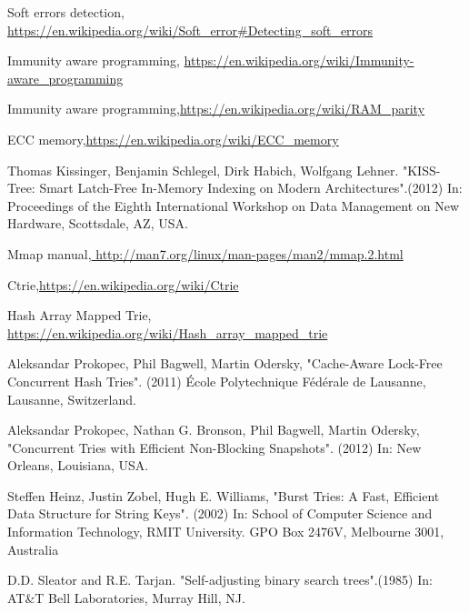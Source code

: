 \documentclass[12pt]{report}
\begin{document}
\begin{thebibliography}{1}
 Soft errors detection, \url{https://en.wikipedia.org/wiki/Soft_error#Detecting_soft_errors}

 Immunity aware programming, \url{https://en.wikipedia.org/wiki/Immunity-aware_programming}


Immunity aware programming,\url{https://en.wikipedia.org/wiki/RAM_parity}

 ECC memory,\url{https://en.wikipedia.org/wiki/ECC_memory}

 Thomas Kissinger, Benjamin Schlegel, Dirk Habich, Wolfgang Lehner. "KISS-Tree: Smart Latch-Free In-Memory Indexing on Modern Architectures".(2012) In: Proceedings of the Eighth International Workshop on Data Management on New Hardware, Scottsdale, AZ, USA.
 
Mmap manual,\url{ http://man7.org/linux/man-pages/man2/mmap.2.html}

 Ctrie,\url{https://en.wikipedia.org/wiki/Ctrie}

Hash Array Mapped Trie, \url{https://en.wikipedia.org/wiki/Hash_array_mapped_trie}

Aleksandar Prokopec, Phil Bagwell, Martin Odersky, "Cache-Aware Lock-Free Concurrent Hash Tries". (2011) École Polytechnique Fédérale de Lausanne, Lausanne, Switzerland.

Aleksandar Prokopec, Nathan G. Bronson, Phil Bagwell, Martin Odersky, "Concurrent Tries with Efficient Non-Blocking Snapshots". (2012) In: New Orleans, Louisiana, USA.

Steffen Heinz, Justin Zobel, Hugh E. Williams, "Burst Tries: A Fast, Efficient Data Structure for String Keys". (2002) In: School of Computer Science and Information Technology, RMIT University.
GPO Box 2476V, Melbourne 3001, Australia

 D.D. Sleator and R.E. Tarjan. "Self-adjusting binary search trees".(1985) In: AT\&T Bell Laboratories, Murray Hill, NJ. 

\end{thebibliography}
\end{document}
